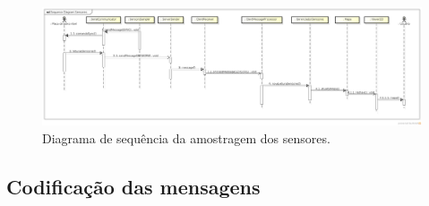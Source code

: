 \begin{figure}[H]
  \centering
  \includegraphics[width=\textwidth, keepaspectratio]{./figuras/diagrama_sequencia_sensores.png}
  \caption{Diagrama de sequência da amostragem dos sensores.}
  \label{fig:diagrama_sequencia_sensores}
\end{figure}


\subsection{Codificação das mensagens}
\label{sec:codificacao_mensagens}

